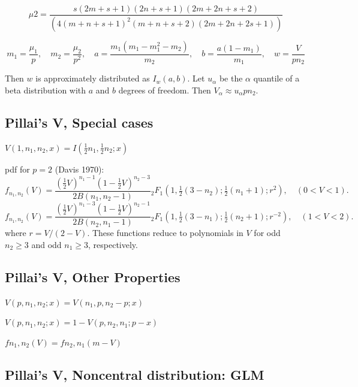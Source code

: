 \begin{equation}
	\mu2=\frac{s(2m+s+1)(2n+s+1)(2m+2n+s+2)}{(4(m+n+s+1)^2(m+n+s+2)(2m+2n+2s+1))}
\end{equation}


\begin{equation}
	m_1= \frac{\mu_1}{p}, \quad  m_2= \frac{\mu_2}{p^2},  \quad  a= \frac{m_1 (m_1 - m_1^2 - m_2)}{m_2},  \quad  b = \frac{a(1-m_1)}{m_1} ,  \quad  w = \frac{V}{p n_2}
\end{equation}


Then $w$ is approximately distributed as $I_w(a,b)$. Let $u_{\alpha}$ be the $\alpha$ quantile of a beta distribution with $a$ and $b$ degrees of freedom. Then 
$V_{\alpha} \approx u_{\alpha} p n_2$.



\subsection{Pillai's V, Special cases}

$V(1,n_1,n_2,x) = I(\tfrac{1}{2}n_1,\tfrac{1}{2}n_2;x)$

\vpara
pdf for $p=2$ (Davis 1970):
\begin{equation}
	f_{n_1,n_2}(V) = \frac{( \tfrac{1}{2} V)^{n_1-1}(1-\tfrac{1}{2}V)^{n_2-3}}{2B(n_1,n_2-1)} {}_2F_1\left(1,\tfrac{1}{2}(3-n_2);\tfrac{1}{2}(n_1+1);r^2\right), \quad (0<V<1).
\end{equation}
\begin{equation}
	f_{n_1,n_2}(V) = \frac{( \tfrac{1}{2} V)^{n_1-3}(1-\tfrac{1}{2}V)^{n_2-1}}{2B(n_2,n_1-1)} {}_2F_1\left(1,\tfrac{1}{2}(3-n_1);\tfrac{1}{2}(n_2+1);r^{-2}\right), \quad (1<V<2).
\end{equation}
where $r=V/(2-V)$. These functions reduce to polynomials in $V$ for odd $n_2 \geq 3$ and odd $n_1 \geq 3$, respectively.


\subsection{Pillai's V, Other Properties}
$V(p,n_1,n_2;x) = V(n_1,p,n_2-p;x)$

$V(p,n_1,n_2;x) = 1-V(p,n_2,n_1;p-x)$

$fn_1,n_2(V) = fn_2,n_1(m-V)$




\subsection{Pillai's V, Noncentral distribution: GLM} 

